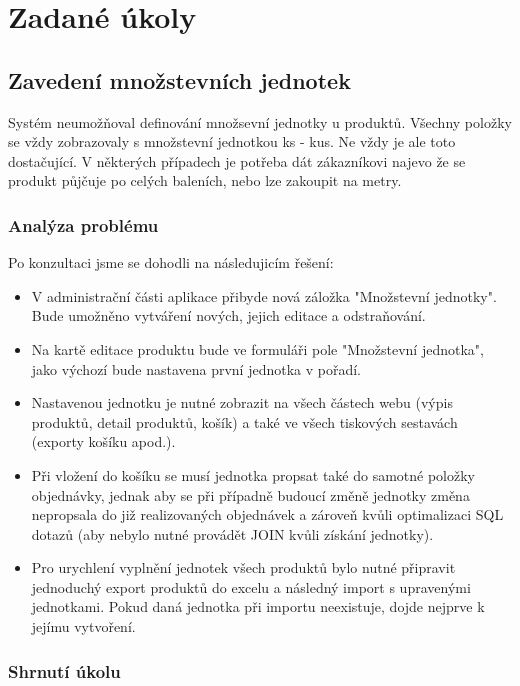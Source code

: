 \chapter{Zadané úkoly}

\section{Zavedení množstevních jednotek}

Systém neumožňoval definování množsevní jednotky u produktů. Všechny položky se vždy zobrazovaly s množstevní jednotkou ks - kus. Ne vždy je ale toto dostačující. V některých případech je potřeba dát zákazníkovi najevo že se produkt půjčuje po celých baleních, nebo lze zakoupit na metry.

\subsection{Analýza problému}

Po konzultaci jsme se dohodli na následujicím řešení:



\begin{itemize}
    \item V administrační části aplikace přibyde nová záložka "Množstevní jednotky". Bude umožněno vytváření nových, jejich editace a odstraňování.
    \item Na kartě editace produktu bude ve formuláři pole "Množstevní jednotka", jako výchozí bude nastavena první jednotka v pořadí.
    \item Nastavenou jednotku je nutné zobrazit na všech částech webu (výpis produktů, detail produktů, košík) a také ve všech tiskových sestavách (exporty košíku apod.). 
    \item Při vložení do košíku se musí jednotka propsat také do samotné položky objednávky, jednak aby se při případně budoucí změně jednotky změna nepropsala do již realizovaných objednávek a zároveň kvůli optimalizaci SQL dotazů (aby nebylo nutné provádět JOIN kvůli získání jednotky).
    \item Pro urychlení vyplnění jednotek všech produktů bylo nutné připravit jednoduchý export produktů do excelu a následný import s upravenými jednotkami. Pokud daná jednotka při importu neexistuje, dojde nejprve k jejímu vytvoření.
\end{itemize}

\subsection{Shrnutí úkolu}

